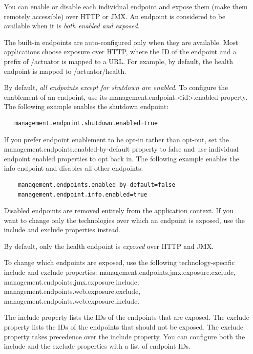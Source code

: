 \documentclass{scrartcl}
\begin{document}
You can enable or disable each individual endpoint and expose them (make them remotely accessible) over HTTP or JMX. An endpoint is considered to be available when it is \textit{both enabled and exposed}.

The built-in endpoints are auto-configured only when they are available. Most applications choose exposure over HTTP, where the ID of the endpoint and a prefix of /actuator is mapped to a URL. For example, by default, the health endpoint is mapped to /actuator/health.

By default, \textit{all endpoints except for shutdown are enabled}. To configure the enablement of an endpoint, use its management.endpoint.<id>.enabled property. The following example enables the shutdown endpoint:

\begin{lstlisting}
   management.endpoint.shutdown.enabled=true
\end{lstlisting}

If you prefer endpoint enablement to be opt-in rather than opt-out, set the management.endpoints.enabled-by-default property to false and use individual endpoint enabled properties to opt back in. The following example enables the info endpoint and disables all other endpoints:

\begin{lstlisting}
    management.endpoints.enabled-by-default=false
    management.endpoint.info.enabled=true
\end{lstlisting}

Disabled endpoints are removed entirely from the application context. If you want to change only the technologies over which an endpoint is exposed, use the include and exclude properties instead.

By default, only the health endpoint is \textit{exposed} over HTTP and JMX.

To change which endpoints are exposed, use the following technology-specific include and exclude properties: management.endpoints.jmx.exposure.exclude,
management.endpoints.jmx.exposure.include; management.endpoints.web.exposure.exclude, management.endpoints.web.exposure.include.

The include property lists the IDs of the endpoints that are exposed. The exclude property lists the IDs of the endpoints that should not be exposed. The exclude property takes precedence over the include property. You can configure both the include and the exclude properties with a list of endpoint IDs.
\end{document}
